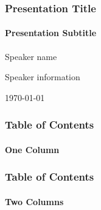 \documentclass[
	aspectratio=169, %
	12pt, %
	t, %
]{beamer}
\begin{document}

\begin{titleframe} %
	\frametitle{Presentation Title}
	\framesubtitle{Presentation Subtitle}

	Speaker name

	Speaker information

	\vfill

	\today
\end{titleframe}


\begin{frame}
	\frametitle{Table of Contents}
	\framesubtitle{One Column}

	\tableofcontents %
\end{frame}


\begin{frame}
    \frametitle{Table of Contents}
	\framesubtitle{Two Columns}
    
    \begin{columns}[t]
        \begin{column}{0.45\textwidth}
            \tableofcontents[sections={1-3}] %
        \end{column}
        \hfill
        \begin{column}{0.45\textwidth}
            \tableofcontents[sections={4-6}] %
        \end{column}
    \end{columns}
\end{frame}
\end{document}
